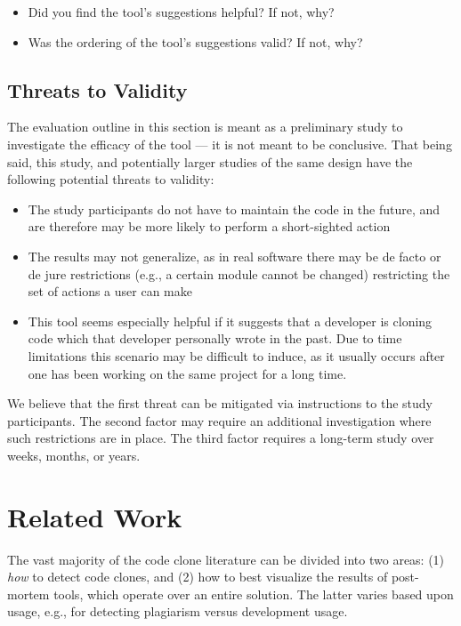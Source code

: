 \documentclass[preprint,10pt]{sigplanconf}
\begin{document}
\begin{itemize}
  \item Did you find the tool's suggestions helpful? If not, why?
  \item Was the ordering of the tool's suggestions valid? If not, why?
\end{itemize}

\subsection{Threats to Validity}
The evaluation outline in this section is meant as a preliminary study
to investigate the efficacy of the tool --- it is not meant to be
conclusive. That being said, this study, and potentially larger
studies of the same design have the following potential threats to
validity:

\begin{itemize}
  \item The study participants do not have to maintain the code in the
    future, and are therefore may be more likely to perform a
    short-sighted action
  \item The results may not generalize, as in real software there may
    be de facto or de jure restrictions (e.g., a certain module cannot
    be changed) restricting the set of actions a user can make
  \item This tool seems especially helpful if it suggests that a
    developer is cloning code which that developer personally wrote in the
    past.  Due to time limitations this scenario may be difficult to
    induce, as it usually occurs after one has been working on the
    same project for a long time.
\end{itemize}

We believe that the first threat can be mitigated via instructions to
the study participants. The second factor may require an additional
investigation where such restrictions are in place.  The third factor
requires a long-term study over weeks, months, or years.

\section{Related Work}
\label{sec:related}

The vast majority of the code clone literature can be divided into two areas: (1)
\emph{how} to detect code clones, and (2) how to best visualize the
results of post-mortem tools, which operate over an entire solution.
The latter varies based upon usage, e.g., for detecting plagiarism
versus development usage.
\end{document}
